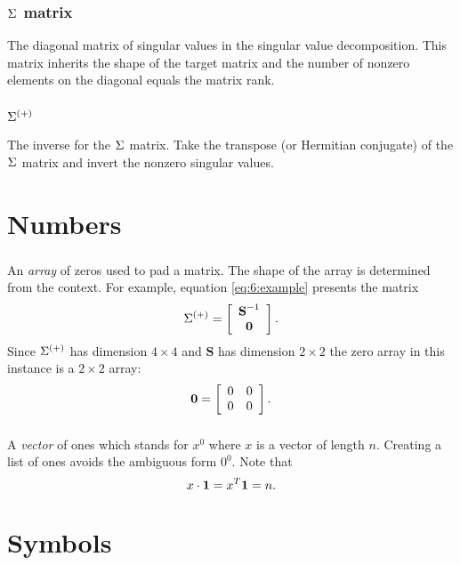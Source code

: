 \subsubsection*{$\sig{}$ matrix}
The diagonal matrix of singular values in the singular value decomposition. This matrix inherits the shape of the target matrix and the number of nonzero elements on the diagonal equals the matrix rank.

\subsubsection*{$\sig{(+)}$}
The inverse for the $\sig{}$ matrix. Take the transpose (or Hermitian conjugate) of the $\sig{}$ matrix and invert the nonzero singular values.

\section*{Numbers} 

\subsubsection*{\zero}
An \textit{array} of zeros used to pad a matrix. The shape of the array is determined from the context. For example, equation \eqref{eq:6:example} presents the matrix
\begin{equation}
\sig{(+)} =
\mat{c}{
 \textbf{S}^{ -1 } \\
 \zero
 }.
\end{equation}
Since $\sig{(+)}$ has dimension $4 \times 4$ and $\textbf{S}$ has dimension $2 \times 2$ the zero array in this instance is a $2 \times 2$ array:
\begin{equation}
  \zero = 
  \mat{cc}{
  0 & 0 \\
  0 & 0
  }.
\end{equation}

\subsubsection*{\one}
A \textit{vector} of ones which stands for $x^0$ where $x$ is a vector of length $n$. Creating a list of ones avoids the ambiguous form $0^0$. Note that 
\begin{equation}
  x \cdot \one = x^T \one = n.
\end{equation}

\section*{Symbols} 

